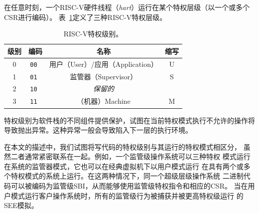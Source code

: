 
在任意时刻，一个RISC-V硬件线程（{\em hart}）运行在某个特权层级（以一个或多个CSR进行编码）。
表~\ref{privlevels}定义了三种RISC-V特权层级。

\begin{table}[h!]
\begin{center}
\begin{tabular}{|c|c|c|c|}
  \hline
   级别 & 编码        & 名称      & 缩写 \\ \hline  
   0     & \tt 00   & 用户（User）/应用（Application） & U     \\ 
   1     & \tt 01   & 监管器（Supervisor） & S           \\ 
   2     & \tt 10   & {\em 保留的} &            \\ 
   3     & \tt 11   & （机器）Machine    & M           \\ 
  \hline
 \end{tabular}
\end{center}
\caption{RISC-V特权级别。
  }
\label{privlevels}
\end{table}


特权级别为软件栈的不同组件提供保护，试图在当前特权模式执行不允许的操作将
导致抛出异常。这种异常一般会导致陷入下一层的执行环境。

\begin{commentary}

在本文的描述中，我们试图将写代码的特权级别与其运行的特权模式相区分，
虽然二者通常紧密联系在一起。例如，一个监管级操作系统可以三种特权
模式运行在系统的监管器模式，它也可以在经典虚拟机下以用户模式运行
在具有两个或多个特权模式的系统上运行。在这两种情况下，同一个超级层级操作系统
二进制代码可以被编码为监管级SBI，从而能够使用监管级特权指令和相应的CSR。
当在用户模式运行客户操作系统时，所有的监管级行为被捕获并被更高特权级运行
的SEE模拟。
\end{commentary}

